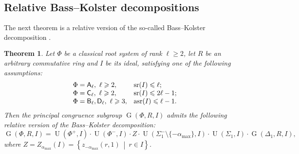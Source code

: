 \documentclass[11pt]{amsart}
\theoremstyle{plain}
\newtheorem{thm}{Theorem}
\numberwithin{equation}{section}
\numberwithin{lemma}{section}
\theoremstyle{definition}
\theoremstyle{remark}
\DeclareMathOperator{\G}{G}
\DeclareMathOperator{\U}{U}
\DeclareMathOperator{\sr}{sr}
\DeclareMathOperator{\asr}{asr}
\newcommand{\rA}{\mathsf{A}}
\newcommand{\rB}{\mathsf{B}}
\newcommand{\rC}{\mathsf{C}}
\newcommand{\rD}{\mathsf{D}}
\begin{document}
\subsection{Relative Bass--Kolster decompositions}\label{sec:bass-kolster}
The next theorem is a relative version of the so-called Bass--Kolster decomposition \cite[Theorem~2.1]{St78}.
\begin{thm}\label{thm:BassKolster}
Let $\Phi$ be a classical root system of rank $\ell\geqslant2$, let $R$ be an arbitrary commutative ring and $I$ be its ideal, satisfying one of the following assumptions:
\[\begin{array}{l@{\quad}l@{\quad}l@{\quad}c}
\Phi = \rA_\ell, \ \ell\geqslant 2, & \sr(I) \leqslant \ell; \\
\Phi = \rC_\ell, \ \ell\geqslant 2, & \sr(I) \leqslant 2\ell-1; \\
\Phi = \rB_\ell, \rD_\ell, \ \ell\geqslant 3, & \asr(I) \leqslant \ell-1.
\end{array}\]
Then the principal congruence subgroup $\G(\Phi, R, I)$ admits the following relative version of the Bass--Kolster decomposition:
\[ \G(\Phi, R, I)=  \U(\Phi^+, I) \cdot \U(\Phi^-, I) \cdot Z \cdot \U(\Sigma_1^-\setminus\{-\alpha_\mathrm{max}\}, I) \cdot \U(\Sigma_1, I) \cdot \G(\Delta_1, R, I), \]
where $Z = Z_{\alpha_\mathrm{max}}(I)=\left\{z_{-\alpha_\mathrm{max}}(r, 1)\ \middle|\ r\in I \right\}$.
\end{thm}
\end{document}
